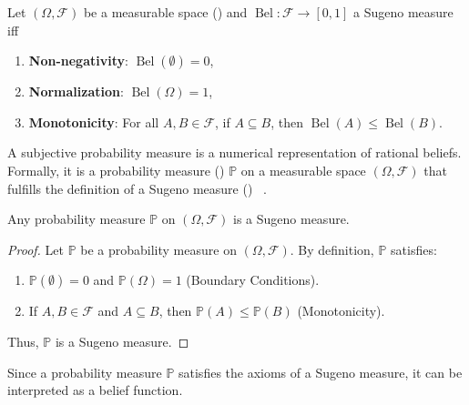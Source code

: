 \newpage
\begin{definition}
	\label{def:sugeno_measure}
	Let $(\Omega, \mathcal{F})$ be a measurable space () and $\operatorname{Bel}: \mathcal{F} \to [0, 1]$ a Sugeno measure iff~\cite{shafer1987}
	\begin{enumerate}
		\item \textbf{Non-negativity}: $\operatorname{Bel}(\emptyset) = 0$,
		\item \textbf{Normalization}: $\operatorname{Bel}(\Omega) = 1$,
		\item \textbf{Monotonicity}: For all $A, B \in \mathcal{F}$, if $A \subseteq B$, then $\operatorname{Bel}(A) \leq \operatorname{Bel}(B)$.
	\end{enumerate}
\end{definition}

\begin{definition}
	\label{def:subjective_probability}
	A subjective probability measure is a numerical representation of rational beliefs. Formally, it is a probability measure () $\mathbb{P}$ on a measurable space $(\Omega, \mathcal{F})$ that fulfills the definition of a Sugeno measure () ~\cite{shafer1987,hoff2009first}.
\end{definition}

\begin{theorem}
	Any probability measure $\mathbb{P}$ on $(\Omega, \mathcal{F})$ is a Sugeno measure.
\end{theorem}
\begin{proof}
	Let $\mathbb{P}$ be a probability measure on $(\Omega, \mathcal{F})$. By definition, $\mathbb{P}$ satisfies:
	\begin{enumerate}
		\item $\mathbb{P}(\emptyset) = 0$ and $\mathbb{P}(\Omega) = 1$ (Boundary Conditions).
		\item If $A, B \in \mathcal{F}$ and $A \subseteq B$, then $\mathbb{P}(A) \leq \mathbb{P}(B)$ (Monotonicity).
	\end{enumerate}
	Thus, $\mathbb{P}$ is a Sugeno measure.
\end{proof}

\begin{corollary}
	Since a probability measure $\mathbb{P}$ satisfies the axioms of a Sugeno measure, it can be interpreted as a belief function.
\end{corollary}


